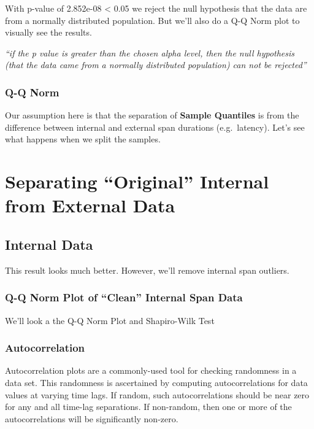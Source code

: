 \documentclass[
  letterpaper,
  DIV=11,
  numbers=noendperiod]{scrartcl}
\begin{document}
With p-value of 2.852e-08 \textless{} 0.05 we reject the null hypothesis
that the data are from a normally distributed population. But we'll also
do a Q-Q Norm plot to visually see the results.

\emph{``if the p value is greater than the chosen alpha level, then the
null hypothesis (that the data came from a normally distributed
population) can not be rejected''}

\hypertarget{q-q-norm}{%
\subsubsection{Q-Q Norm}\label{q-q-norm}}

Our assumption here is that the separation of \textbf{Sample Quantiles}
is from the difference between internal and external span durations
(e.g.~latency). Let's see what happens when we split the samples.

\hypertarget{separating-original-internal-from-external-data}{%
\section{Separating ``Original'' Internal from External
Data}\label{separating-original-internal-from-external-data}}

\hypertarget{internal-data}{%
\subsection{Internal Data}\label{internal-data}}

This result looks much better. However, we'll remove internal span
outliers.

\hypertarget{q-q-norm-plot-of-clean-internal-span-data}{%
\subsubsection{Q-Q Norm Plot of ``Clean'' Internal Span
Data}\label{q-q-norm-plot-of-clean-internal-span-data}}

We'll look a the Q-Q Norm Plot and Shapiro-Wilk Test

\hypertarget{autocorrelation}{%
\subsubsection{Autocorrelation}\label{autocorrelation}}

Autocorrelation plots are a commonly-used tool for checking randomness
in a data set. This randomness is ascertained by computing
autocorrelations for data values at varying time lags. If random, such
autocorrelations should be near zero for any and all time-lag
separations. If non-random, then one or more of the autocorrelations
will be significantly non-zero.
\end{document}
